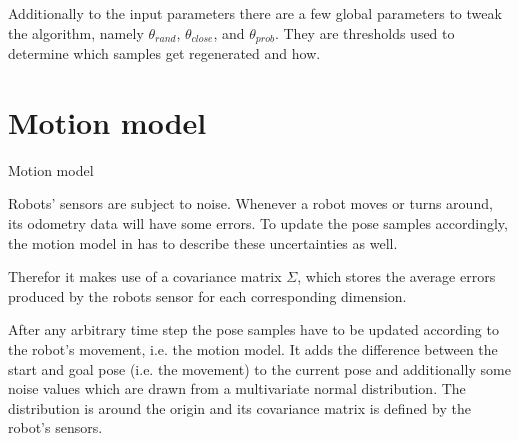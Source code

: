 \documentclass[Thesis.tex]{subfiles}
\begin{document}
Additionally to the input parameters there are a few global parameters to tweak the algorithm, namely $\theta_{rand}$, $\theta_{close}$, and $\theta_{prob}$. They are thresholds used to determine which samples get regenerated and how.
%
%
%
%
%
%
\section{Motion model}\label{sec:motion_model_section}
%
\begin{algorithm}[!htp]
\caption{Motion model}
\label{alg:motionmodel}

\end{algorithm}
%
Robots' sensors are subject to noise. Whenever a robot moves or turns around, its odometry data will have some errors.
To update the pose samples accordingly, the motion model in  has to describe these uncertainties as well.

Therefor it makes use of a covariance matrix $\Sigma$, which stores the average errors produced by the robots sensor for each corresponding dimension.

After any arbitrary time step the pose samples have to be updated according to the robot's movement, i.e. the motion model. It adds the difference between the start and goal pose (i.e. the movement) to the current pose and additionally some noise values which are drawn from a multivariate normal distribution. The distribution is around the origin and its covariance matrix is defined by the robot's sensors. 
\end{document}
